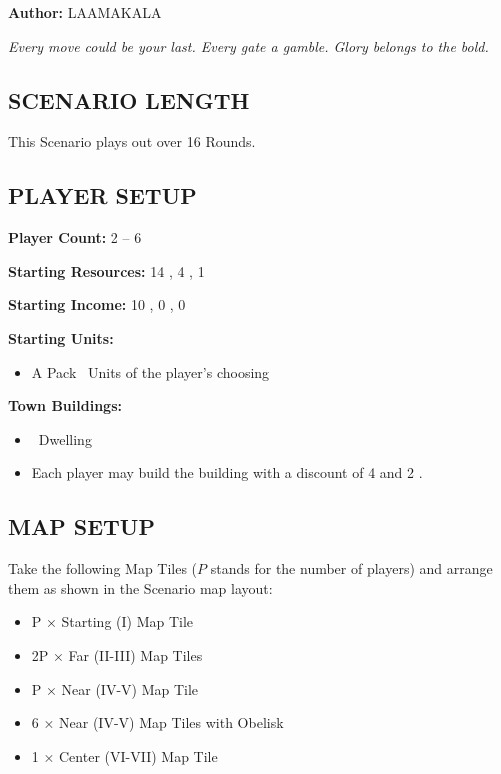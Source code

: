 
\begin{multicols*}{2}

\textbf{Author:} LAAMAKALA

\textit{Every move could be your last. Every gate a gamble. Glory belongs to the bold.}

\subsection*{\MakeUppercase{Scenario Length}}
This Scenario plays out over 16 Rounds.

\subsection*{\MakeUppercase{Player Setup}}
\textbf{Player Count:} 2 -- 6

\textbf{Starting Resources:} 14 , 4 , 1 

\textbf{Starting Income:} 10 , 0 , 0 

\textbf{Starting Units:}

\begin{itemize}
  \item A Pack \bronze\ Units of the player's choosing
\end{itemize}

\textbf{Town Buildings:}
\begin{itemize}
  \item \bronze\ Dwelling
  \item Each player may build the  building with a discount of 4  and 2 .
\end{itemize}

\subsection*{\MakeUppercase{Map Setup}}
Take the following Map Tiles ($P$ stands for the number of players) and arrange them as shown in the Scenario map layout:

\begin{itemize}
  \item P × Starting (I) Map Tile
  \item 2P × Far (II-III) Map Tiles
  \item P × Near (IV-V) Map Tile
  \item 6 × Near (IV-V) Map Tiles with Obelisk
  \item 1 × Center (VI-VII) Map Tile
\end{itemize}


\end{multicols*}
